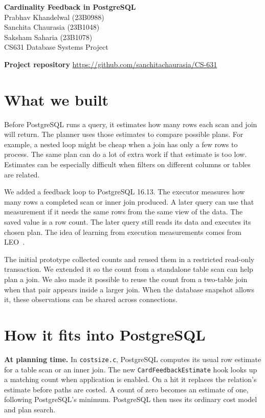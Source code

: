 \documentclass[11pt,a4paper]{article}
\begin{document}
\begin{center}
{\Large\bfseries Cardinality Feedback in PostgreSQL}\\[6pt]
Prabhav Khandelwal (23B0988)\\
Sanchita Chaurasia (23B1048)\\
Saksham Saharia (23B1078)\\[4pt]
CS631 Database Systems Project
\end{center}

\textbf{Project repository}\quad
\url{https://github.com/sanchitachaurasia/CS-631}

\section*{What we built}
Before PostgreSQL runs a query, it estimates how many rows each scan and join
will return. The planner uses those estimates to compare possible plans. For
example, a nested loop might be cheap when a join has only a few rows to
process. The same plan can do a lot of extra work if that estimate is too low.
Estimates can be especially difficult when filters on different columns or
tables are related.

We added a feedback loop to PostgreSQL 16.13. The executor measures how many
rows a completed scan or inner join produced. A later query can use that
measurement if it needs the same rows from the same view of the data. The
saved value is a row count. The later query still reads its data and executes
its chosen plan. The idea of learning from execution measurements comes from
LEO~\cite{leo}.

The initial prototype collected counts and reused them in a restricted
read-only transaction. We extended it so the count from a standalone table
scan can help plan a join. We also made it possible to reuse the count from a
two-table join when that pair appears inside a larger join. When the database
snapshot allows it, these observations can be shared across connections.

\section*{How it fits into PostgreSQL}
\textbf{At planning time.} In \texttt{costsize.c}, PostgreSQL computes its
usual row estimate for a table scan or an inner join. The new
\texttt{CardFeedbackEstimate} hook looks up a matching count when application
is enabled. On a hit it replaces the relation's estimate before paths are
costed. A count of zero becomes an estimate of one, following PostgreSQL's
minimum. PostgreSQL then uses its ordinary cost model and plan search.
\end{document}
